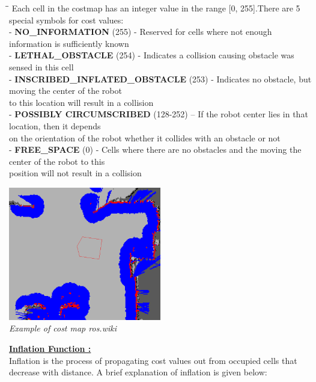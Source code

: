 \documentclass[10pt,a4paper]{article}
\begin{document}
\begin{tabbing}
\hspace{1cm}\=\hspace{1cm}\=\kill
Each cell in the costmap has an integer value in the range [0, 255].There are 5 special symbols for cost values:\\
\> - \textbf{NO\_INFORMATION} (255) - Reserved for cells where not enough information is sufficiently known\\
\> - \textbf{LETHAL\_OBSTACLE} (254) - Indicates a collision causing obstacle was sensed in this cell\\
\> - \textbf{INSCRIBED\_INFLATED\_OBSTACLE} (253) - Indicates no obstacle, but moving the center of the robot\\ to this location will result in a collision\\
\> - \textbf{POSSIBLY CIRCUMSCRIBED} (128-252) – If the robot center lies in that location, then it depends\\ on the orientation of the robot whether it collides with an obstacle or not \\
\> - \textbf{FREE\_SPACE} (0) - Cells where there are no obstacles and the moving the center of the robot to this\\ position will not result in a collision\\
\end{tabbing}

\begin{center}
\includegraphics[width=0.5\textwidth]{images/costmap.png}\\
\textit{Example of cost map ros.wiki} \\
\end{center}


\underline{\textbf{Inflation Function :}}\\
Inflation is the process of propagating cost values out from occupied cells that decrease with distance. A brief explanation of inflation is given below:\\
\end{document}
